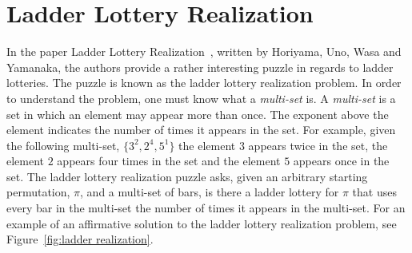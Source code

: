 

\section{Ladder Lottery Realization}

In the paper Ladder Lottery Realization~\cite{A3}, written by Horiyama, Uno, Wasa and Yamanaka, the authors provide 
a rather interesting puzzle in regards to ladder lotteries. The puzzle 
is known as the ladder lottery realization problem. In order to understand
the problem, one must know what a \emph{multi-set} is. A \emph{multi-set}
is a set in which an element may appear more than once. The exponent 
above the element indicates the number of times it appears in the set.
For example, given the following multi-set, $\{3^{2}, 2^{4}, 5^{1}\}$ 
the element $3$ appears twice in the set, the element $2$ appears four times
in the set and the element $5$ appears once in the set.
The ladder lottery realization puzzle asks, given an arbitrary starting permutation, $\pi$, 
and a multi-set of bars, 
is there a ladder lottery for $\pi$
that uses every bar in the multi-set the number 
of times it appears in the  multi-set. 
For an example of an affirmative solution to the ladder lottery realization problem, see Figure~\ref{fig:ladder realization}.

